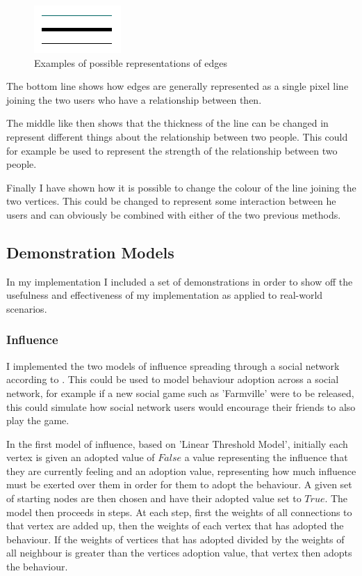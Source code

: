 \documentclass[12pt,a4paper]{article}
\begin{document}
\begin{figure}
\caption{Examples of possible representations of edges}
\label{fig:edges}
\centering
\includegraphics[scale=1]{Edges.png}
\end{figure}

The bottom line shows how edges are generally represented as a single pixel line joining the two users who have a relationship between then.

The middle like then shows that the thickness of the line can be changed in represent different things about the relationship between two people. This could for example be used to represent the strength of the relationship between two people.

Finally I have shown how it is possible to change the colour of the line joining the two vertices. This could be changed to represent some interaction between he users and can obviously be combined with either of the two previous methods.

\subsection{Demonstration Models}

In my implementation I included a set of demonstrations in order to show off the usefulness and effectiveness of my implementation as applied to real-world scenarios.

\subsubsection{Influence}

I implemented the two models of influence spreading through a social network according to \cite{kempe2003maximizing}. This could be used to model behaviour adoption across a social network, for example if a new social game such as 'Farmville' were to be released, this could simulate how social network users would encourage their friends to also play the game.

In the first model of influence, based on 'Linear Threshold Model', initially each vertex is given an adopted value of $False$ a value representing the influence that they are currently feeling and an adoption value, representing how much influence must be exerted over them in order for them to adopt the behaviour. A given set of starting nodes are then chosen and have their adopted value set to $True$. The model then proceeds in steps. At each step, first the weights of all connections to that vertex are added up, then the weights of each vertex that has adopted the behaviour. If the weights of vertices that has adopted divided by the weights of all neighbour is greater than the vertices adoption value, that vertex then adopts the behaviour.
\end{document}
